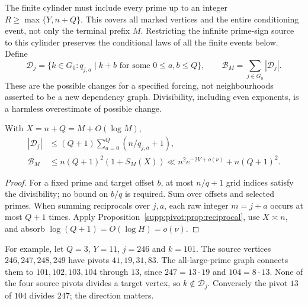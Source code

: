 The finite cylinder must include every prime up to an integer
$R\ge\max\{Y,n+Q\}$. This covers all marked vertices and the entire
conditioning event, not only the terminal prefix $M$. Restricting the
infinite prime-sign source to this cylinder preserves the conditional
laws of all the finite events below. Define
\begin{equation}\label{supp:pivot:eq:change-sets}
 \mathscr D_j=\{k\in G_0:q_{j,a}\mid k+b
                   \text{ for some }0\le a,b\le Q\},
 \qquad \mathscr B_M=\sum_{j\in G_0}|\mathscr D_j|.
\end{equation}
These are the possible changes for a specified forcing, not neighbourhoods asserted to be a new dependency graph. Divisibility, including even exponents, is a harmless overestimate of possible change.

\begin{proposition}\label{supp:pivot:prop:footprint}
With $X=n+Q=M+O(\log M)$,
\begin{align}
 |\mathscr D_j|&\le(Q+1)\sum_{a=0}^Q(n/q_{j,a}+1),\label{supp:pivot:eq:footprint-point}\\
 \mathscr B_M&\le n(Q+1)^2(1+S_M(X))
          \ll n^2e^{-2V+o(\nu)}+n(Q+1)^2.\label{supp:pivot:eq:footprint}
\end{align}
\end{proposition}
\begin{proof}
For a fixed prime and target offset $b$, at most $n/q+1$ grid indices satisfy the divisibility; no bound on $b/q$ is required. Sum over offsets and selected primes. When summing reciprocals over $j,a$, each raw integer $m=j+a$ occurs at most $Q+1$ times. Apply Proposition~\ref{supp:pivot:prop:reciprocal}, use $X\asymp n$, and absorb $\log(Q+1)=O(\log H)=o(\nu)$.
\end{proof}

For example, let $Q=3$, $Y=11$, $j=246$ and $k=101$. The source vertices
$246,247,248,249$ have pivots $41,19,31,83$.
The all-large-prime graph connects them to $101,102,103,104$ through $13$, since
$247=13\cdot19$ and $104=8\cdot13$. None of the four source pivots divides a target vertex, so $k\notin\mathscr D_j$. Conversely the pivot $13$ of $104$ divides $247$; the direction matters.

